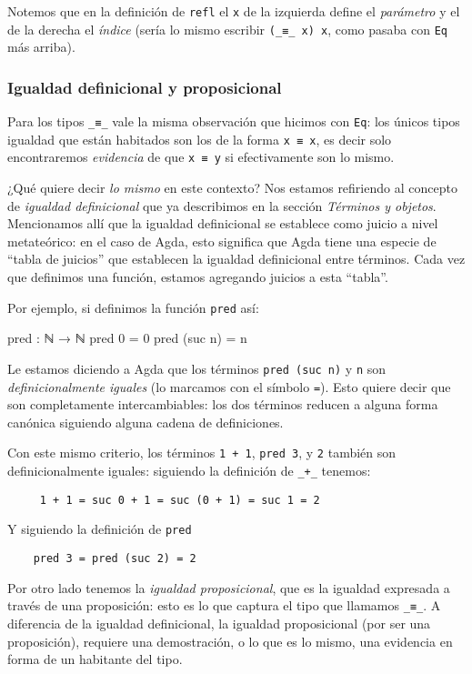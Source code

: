 \documentclass[11pt]{article} %
\begin{document}
Notemos que en la definición de \verb|refl| el \verb|x| de la izquierda define el \textit{parámetro} y el de la derecha el \textit{índice} (sería lo mismo escribir \verb|(_≡_ x) x|, como pasaba con \verb|Eq| más arriba).

\subsubsection{Igualdad definicional y proposicional}
Para los tipos \verb|_≡_| vale la misma observación que hicimos con \verb|Eq|: los únicos tipos igualdad que están habitados son los de la forma \verb|x ≡ x|, es decir solo encontraremos \textit{evidencia} de que \verb|x ≡ y| si efectivamente son lo mismo. 

¿Qué quiere decir \textit{lo mismo} en este contexto? Nos estamos refiriendo al concepto de \textit{igualdad definicional} que ya describimos en la sección \textit{Términos y objetos}. Mencionamos allí que la igualdad definicional se establece como juicio a nivel metateórico: en el caso de Agda, esto significa que Agda tiene una especie de ``tabla de juicios'' que establecen la igualdad definicional entre términos. Cada vez que definimos una función, estamos agregando juicios a esta ``tabla''. 

Por ejemplo, si definimos la función \verb|pred| así:

\begin{code}
pred : ℕ → ℕ
pred 0 = 0
pred (suc n) = n 
\end{code}

Le estamos diciendo a Agda que los términos \verb|pred (suc n)| y \verb|n| son \textit{definicionalmente iguales} (lo marcamos con el símbolo \verb|=|). Esto quiere decir que son completamente intercambiables: los dos términos reducen a alguna forma canónica siguiendo alguna cadena de definiciones. 

Con este mismo criterio, los términos \verb|1 + 1|, \verb|pred 3|, y \verb|2| también son definicionalmente iguales: siguiendo la definición de \verb|_+_| tenemos:

\verb|     1 + 1 = suc 0 + 1 = suc (0 + 1) = suc 1 = 2|

Y siguiendo la definición de \verb|pred|

\verb|    pred 3 = pred (suc 2) = 2|

Por otro lado tenemos la \textit{igualdad proposicional}, que es la igualdad expresada a través de una proposición: esto es lo que captura el tipo que llamamos \verb|_≡_|. A diferencia de la igualdad definicional, la igualdad proposicional (por ser una proposición), requiere una demostración, o lo que es lo mismo, una evidencia en forma de un habitante del tipo.
\end{document}
